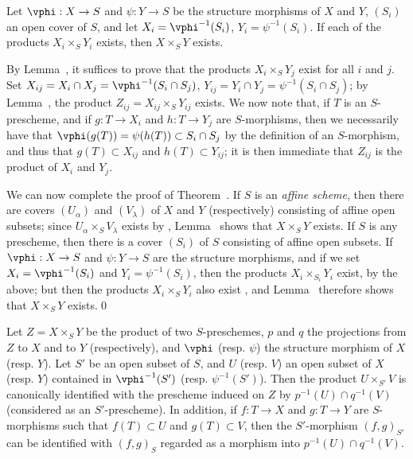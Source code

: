 \begin{lemma}[3.2.6.4]
\label{I.3.2.6.4}
Let $\vphi:X\to S$ and $\psi:Y\to S$ be the structure morphisms of $X$ and $Y$, $(S_i)$ an open
cover of $S$, and let $X_i=\vphi^{-1}(S_i)$, $Y_i=\psi^{-1}(S_i)$. If each of the products
$X_i\times_S Y_i$ exists, then $X\times_S Y$ exists.
\end{lemma}

By Lemma~, it suffices to prove that the products
$X_i\times_S Y_j$ exist for all $i$ and $j$. Set
$X_{ij}=X_i\cap X_j=\vphi^{-1}(S_i\cap S_j)$, $Y_{ij}=Y_i\cap Y_j=\psi^{-1}(S_i\cap S_j)$;
by Lemma~, the product $Z_{ij}=X_{ij}\times_S Y_{ij}$ exists. We now
note that, if $T$ is an $S$-prescheme, and if $g:T\to X_i$ and $h:T\to Y_j$ are $S$-morphisms,
then we necessarily have that $\vphi(g(T))=\psi(h(T))\subset S_i\cap S_j$ by the
definition of an $S$-morphism, and thus that $g(T)\subset X_{ij}$ and $h(T)\subset Y_{ij}$; it is
then immediate that $Z_{ij}$ is the product of $X_i$ and $Y_j$.

\begin{env}[3.2.6.5]
\label{I.3.2.6.5}
We can now complete the proof of Theorem~. If $S$ is an \emph{affine
scheme}, then there are covers $(U_\alpha)$ and $(V_\lambda)$ of $X$ and $Y$ (respectively)
consisting of affine open subsets; since $U_\alpha\times_S V_\lambda$ exists by
, Lemma~ shows that $X\times_S Y$ exists. If $S$
is any prescheme, then there is a cover $(S_i)$ of $S$ consisting of affine open subsets. If
$\vphi:X\to S$ and $\psi:Y\to S$ are the structure morphisms, and if we set
$X_i=\vphi^{-1}(S_i)$ and $Y_i=\psi^{-1}(S_i)$, then the products $X_i\times_{S_i}Y_i$ exist, by the
above; but then the products $X_i\times_S Y_i$ also exist , and
Lemma~ therefore shows that $X\times_S Y$ exists.\qed
\end{env}

\begin{corollary}[3.2.7]
\label{I.3.2.7}
Let $Z=X\times_S Y$ be the product of two $S$-preschemes, $p$ and $q$ the projections from $Z$
to $X$ and to $Y$ (respectively), and $\vphi$ (resp. $\psi$) the structure morphism of
$X$ (resp. $Y$). Let $S'$ be
an open subset of $S$, and $U$ (resp. $V$) an open subset of $X$ (resp. $Y$) contained in
$\vphi^{-1}(S')$ (resp. $\psi^{-1}(S')$). Then the product $U\times_{S'}V$ is canonically
identified with the prescheme induced on $Z$ by $p^{-1}(U)\cap q^{-1}(V)$ (considered as an
$S'$-prescheme). In addition, if $f:T\to X$ and $g:T\to Y$ are $S$-morphisms such that
$f(T)\subset U$ and $g(T)\subset V$, then the $S'$-morphism $(f,g)_{S'}$ can be identified with
$(f,g)_S$ regarded as a morphism into $p^{-1}(U)\cap q^{-1}(V)$.
\end{corollary}

